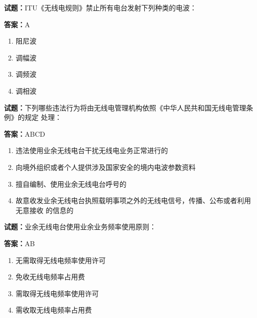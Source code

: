 \documentclass{ctexbook}
\begin{document}
\vspace{1em}

\textbf{试题：}ITU《无线电规则》禁止所有电台发射下列种类的电波： 


\textbf{答案：}A 

\begin{enumerate}[leftmargin=3em]
  \item 阻尼波 

  \item 调幅波 

  \item 调频波 

  \item 调相波 

\end{enumerate}





\vspace{1em}

\textbf{试题：}下列哪些违法行为将由无线电管理机构依照《中华人民共和国无线电管理条例》的规定
处理： 

\textbf{答案：}ABCD 

\begin{enumerate}[leftmargin=3em]
  \item 违法使用业余无线电台干扰无线电业务正常进行的 

  \item 向境外组织或者个人提供涉及国家安全的境内电波参数资料 

  \item 擅自编制、使用业余无线电台呼号的 

  \item 故意收发业余无线电台执照载明事项之外的无线电信号，传播、公布或者利用无意接收
的信息的 

\end{enumerate}





\vspace{1em}

\textbf{试题：}业余无线电台使用业余业务频率使用原则： 

\textbf{答案：}AB 

\begin{enumerate}[leftmargin=3em]
  \item 无需取得无线电频率使用许可 

  \item 免收无线电频率占用费 

  \item 需取得无线电频率使用许可 

  \item 需收取无线电频率占用费 

\end{enumerate}
\end{document}
